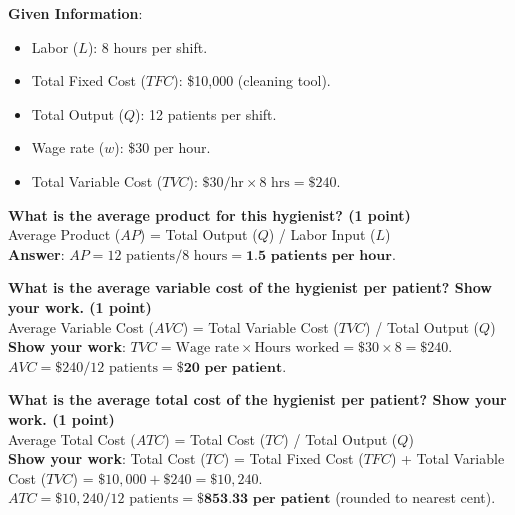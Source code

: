 \documentclass[11pt, letterpaper]{article}
\begin{document}
\textbf{Given Information}:
\begin{itemize}[leftmargin=*, noitemsep]
    \item Labor ($L$): 8 hours per shift.
    \item Total Fixed Cost ($TFC$): \$10,000 (cleaning tool).
    \item Total Output ($Q$): 12 patients per shift.
    \item Wage rate ($w$): \$30 per hour.
    \item Total Variable Cost ($TVC$): $\$30/\text{hr} \times 8\text{ hrs} = \$240$.
\end{itemize}

\textbf{What is the average product for this hygienist? (1 point)} \\
Average Product ($AP$) = Total Output ($Q$) / Labor Input ($L$) \\
\textbf{Answer}: $AP = 12 \text{ patients} / 8 \text{ hours} = \textbf{1.5 patients per hour}$.

\textbf{What is the average variable cost of the hygienist per patient? Show your work. (1 point)} \\
Average Variable Cost ($AVC$) = Total Variable Cost ($TVC$) / Total Output ($Q$) \\
\textbf{Show your work}: $TVC = \text{Wage rate} \times \text{Hours worked} = \$30 \times 8 = \$240$. \\
$AVC = \$240 / 12 \text{ patients} = \textbf{\$20 per patient}$.

\textbf{What is the average total cost of the hygienist per patient? Show your work. (1 point)} \\
Average Total Cost ($ATC$) = Total Cost ($TC$) / Total Output ($Q$) \\
\textbf{Show your work}: Total Cost ($TC$) = Total Fixed Cost ($TFC$) + Total Variable Cost ($TVC$) = $\$10,000 + \$240 = \$10,240$. \\
$ATC = \$10,240 / 12 \text{ patients} = \textbf{\$853.33 per patient}$ (rounded to nearest cent).
\end{document}
